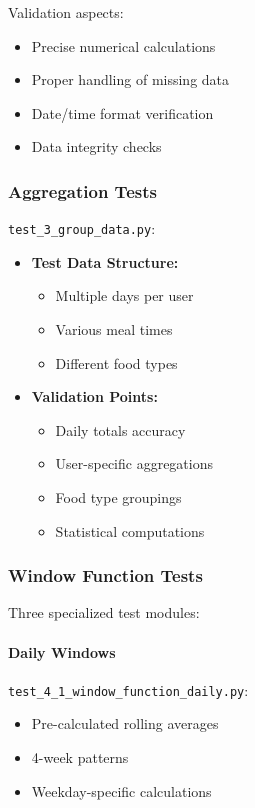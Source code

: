 Validation aspects:
\begin{itemize}
    \item Precise numerical calculations
    \item Proper handling of missing data
    \item Date/time format verification
    \item Data integrity checks
\end{itemize}

\subsubsection{Aggregation Tests}
\texttt{test\_3\_group\_data.py}:

\begin{itemize}
    \item \textbf{Test Data Structure:}
    \begin{itemize}
        \item Multiple days per user
        \item Various meal times
        \item Different food types
    \end{itemize}
    
    \item \textbf{Validation Points:}
    \begin{itemize}
        \item Daily totals accuracy
        \item User-specific aggregations
        \item Food type groupings
        \item Statistical computations
    \end{itemize}
\end{itemize}

\subsubsection{Window Function Tests}
Three specialized test modules:

\paragraph{Daily Windows} \texttt{test\_4\_1\_window\_function\_daily.py}:
\begin{itemize}
    \item Pre-calculated rolling averages
    \item 4-week patterns
    \item Weekday-specific calculations
\end{itemize}

